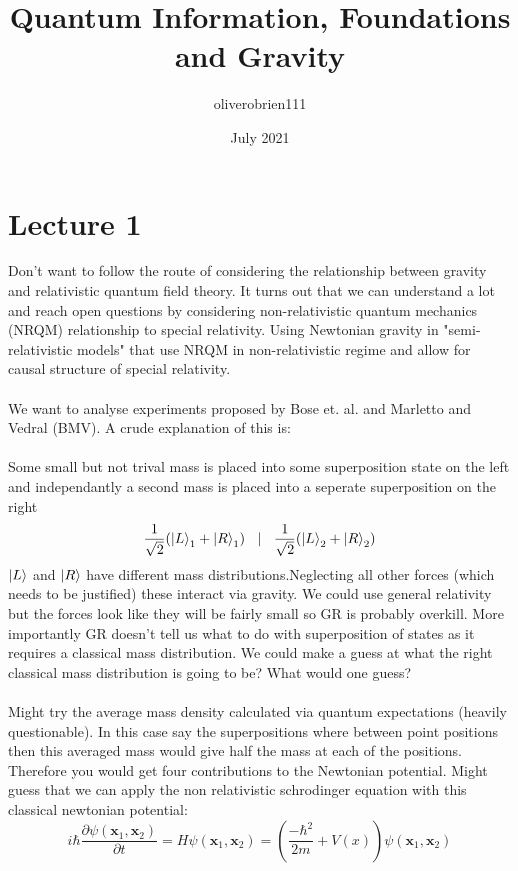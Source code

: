 \documentclass{article}
\title{Quantum Information, Foundations and Gravity}
\author{oliverobrien111 }
\date{July 2021}
\begin{document}
\maketitle

\section{Lecture 1}
Don't want to follow the route of considering the relationship between gravity and relativistic quantum field theory. It turns out that we can understand a lot and reach open questions by considering non-relativistic quantum mechanics (NRQM) relationship to special relativity. Using Newtonian gravity in "semi-relativistic models" that use NRQM in non-relativistic regime and allow for causal structure of special relativity.\\\\
We want to analyse experiments proposed by Bose et. al. and Marletto and Vedral (BMV). A crude explanation of this is:\\\\
Some small but not trival mass is placed into some superposition state on the left and independantly a second mass is placed into a seperate superposition on the right
\begin{equation}                \frac{1}{\sqrt{2}}( \ket{L}_1 + \ket{R}_1) \> \> \> \> | \> \> \> \> \frac{1}{\sqrt{2}} ( \ket{L}_2 + \ket{R}_2)
       \end{equation}
       $\ket{L}$ and $\ket{R}$ have different mass distributions.Neglecting all other forces (which needs to be justified) these interact via gravity. We could use general relativity but the forces look like they will be fairly small so GR is probably overkill. More importantly GR doesn't tell us what to do with superposition of states as it requires a classical mass distribution. We could make a guess at what the right classical mass distribution is going to be? What would one guess?\\\\ Might try the average mass density calculated via quantum expectations (heavily questionable). In this case say the superpositions where between point positions then this averaged mass would give half the mass at each of the positions. Therefore you would get four contributions to the Newtonian potential. Might guess that we can apply the non relativistic schrodinger equation with this classical newtonian potential:
       \begin{equation}
               i \hbar \frac{\partial \psi(\bm x_1, \bm x_2)}{\partial t} = H \psi(\bm x_1, \bm x_2) = (\frac{-\hbar^2}{2m} + V(x)) \psi(\bm x_1, \bm x_2)
       \end{equation}
\end{document}
